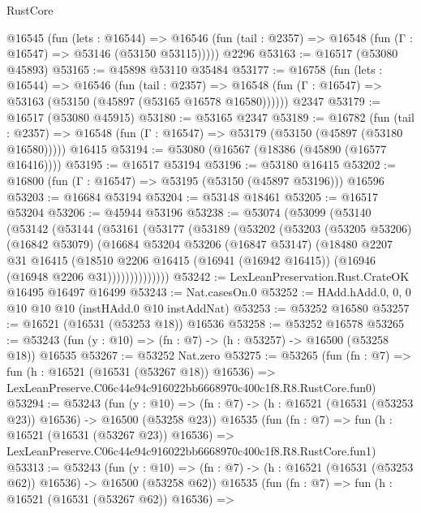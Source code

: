 \begin{lexlean}{RustCore}
\begin{coremodule}
    @16545
      (fun (lets : @16544) =>
      @16546 (fun (tail : @2357) => @16548 (fun (Γ : @16547) => @53146 (@53150 @53115)))))
    @2296
@53163 := @16517 (@53080 @45893)
@53165 := @45898 @53110 @35484
@53177 := @16758
    (fun (lets : @16544) =>
    @16546
      (fun (tail : @2357) =>
      @16548 (fun (Γ : @16547) => @53163 (@53150 (@45897 (@53165 @16578 @16580))))))
    @2347
@53179 := @16517 (@53080 @45915)
@53180 := @53165 @2347
@53189 := @16782
    (fun (tail : @2357) => @16548 (fun (Γ : @16547) => @53179 (@53150 (@45897 (@53180 @16580)))))
    @16415
@53194 := @53080 (@16567 (@18386 (@45890 (@16577 @16416))))
@53195 := @16517 @53194
@53196 := @53180 @16415
@53202 := @16800 (fun (Γ : @16547) => @53195 (@53150 (@45897 @53196))) @16596
@53203 := @16684 @53194
@53204 := @53148 @18461
@53205 := @16517 @53204
@53206 := @45944 @53196
@53238 := @53074
    (@53099
      (@53140
        (@53142
          (@53144
            (@53161
              (@53177
                (@53189
                  (@53202
                    (@53203
                      (@53205 @53206)
                      (@16842 @53079)
                      (@16684
                        @53204
                        @53206
                        (@16847 @53147)
                        (@18480
                          @2207
                          @31
                          @16415
                          (@18510
                            @2206
                            @16415
                            (@16941 (@16942 @16415))
                            (@16946 (@16948 @2206 @31))))))))))))))
@53242 := LexLeanPreservation.Rust.CrateOK @16495 @16497 @16499
@53243 := Nat.casesOn.{0}
@53252 := HAdd.hAdd.{0, 0, 0} @10 @10 @10 (instHAdd.{0} @10 instAddNat)
@53253 := @53252 @16580
@53257 := @16521 (@16531 (@53253 @18)) @16536
@53258 := @53252 @16578
@53265 := @53243 (fun (y : @10) => (fn : @7) -> (h : @53257) -> @16500 (@53258 @18)) @16535
@53267 := @53252 Nat.zero
@53275 := @53265
    (fun (fn : @7) =>
    fun (h : @16521 (@16531 (@53267 @18)) @16536) =>
    LexLeanPreserve.C06c44e94c916022bb6668970c400c1f8.R8.RustCore.fun0)
@53294 := @53243
    (fun (y : @10) => (fn : @7) -> (h : @16521 (@16531 (@53253 @23)) @16536) -> @16500 (@53258 @23))
    @16535
    (fun (fn : @7) =>
    fun (h : @16521 (@16531 (@53267 @23)) @16536) =>
    LexLeanPreserve.C06c44e94c916022bb6668970c400c1f8.R8.RustCore.fun1)
@53313 := @53243
    (fun (y : @10) => (fn : @7) -> (h : @16521 (@16531 (@53253 @62)) @16536) -> @16500 (@53258 @62))
    @16535
    (fun (fn : @7) =>
    fun (h : @16521 (@16531 (@53267 @62)) @16536) =>

\end{coremodule}
\end{lexlean}
